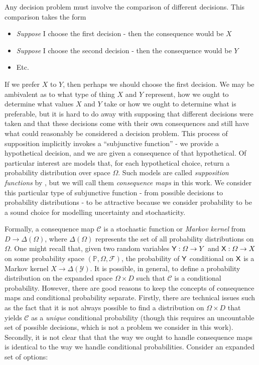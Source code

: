 Any decision problem must involve the comparison of different decisions. This comparison takes the form
\begin{itemize}
	\item \emph{Suppose} I choose the first decision - then the consequence would be $X$
	\item \emph{Suppose} I choose the second decision - then the consequence would be $Y$
	\item Etc.
\end{itemize}

If we prefer $X$ to $Y$, then perhaps we should choose the first decision. We may be ambivalent as to what type of thing $X$ and $Y$ represent, how we ought to determine what values $X$ and $Y$ take or how we ought to determine what is preferable, but it is hard to do away with supposing that different decisions were taken and that these decisions come with their own consequences and still have what could reasonably be considered a decision problem. This process of supposition implicitly invokes a ``subjunctive function'' - we provide a hypothetical decision, and we are given a consequence of that hypothetical. Of particular interest are models that, for each hypothetical choice, return a probability distribution over space $\Omega$. Such models are called \emph{supposition functions} by \citet{joyce_why_2000}, but we will call them \emph{consequence maps} in this work. We consider this particular type of subjunctive function - from possible decisions to probability distributions - to be attractive because we consider probability to be a sound choice for modelling uncertainty and stochasticity.

Formally, a consequence map $\mathscr{C}$ is a stochastic function or \emph{Markov kernel} from $D\to \Delta(\Omega)$, where $\Delta(\Omega)$ represents the set of all probability distributions on $\Omega$. One might recall that, given two random variables $\mathsf{Y}:\Omega\to Y$ and $\mathsf{X}:\Omega \to X$ on some probability space $(\mathbb{P},\Omega,\mathcal{F})$, the probability of $\mathsf{Y}$ conditional on $\mathsf{X}$ is a Markov kernel $X\to \Delta(\mathcal{Y})$. It is possible, in general, to define a probability distribution on the expanded space $\Omega\times D$ such that $\mathscr{C}$ is a conditional probability. However, there are good reasons to keep the concepts of consequence maps and conditional probability separate. Firstly, there are technical issues such as the fact that it is not always possible to find a distribution on $\Omega\times D$ that yields $\mathscr{C}$ as a \emph{unique} conditional probability \citep{hajek_what_2003} (though this requires an uncountable set of possible decisions, which is not a problem we consider in this work). Secondly, it is not clear that that the way we ought to handle consequence maps is identical to the way we handle conditional probabilities. Consider an expanded set of options:

